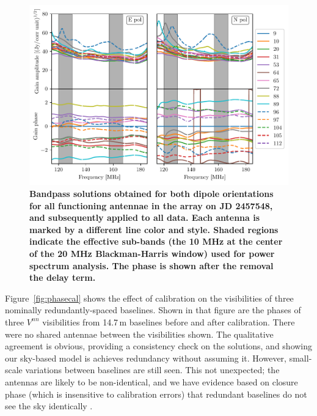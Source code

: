 \documentclass[twocolumn, trackchanges]{aastex61}
\newcommand{\edited}[1]{{\bf \color{red} #1}}
\begin{document}
{\begin{figure}
\centering
\includegraphics[scale=0.5]{gains.pdf}
\caption{\edited{Bandpass solutions obtained for both dipole orientations for all functioning antennae in the array on JD 2457548, and subsequently applied to all data.  Each antenna is marked by a different line color and style. Shaded regions indicate the effective sub-bands (the 10 MHz at the center of the 20 MHz Blackman-Harris window) used for power spectrum analysis.  The phase is shown after the removal the delay term.}}
\label{fig:bandpass}
\end{figure}


Figure~\ref{fig:phasecal} shows the effect of calibration on the visibilities of three nominally redundantly-spaced baselines.  Shown in that figure are the phases of three $V^{nn}$ visibilities from 14.7\,m baselines before and after calibration. There were no shared antennae between the visibilities shown. The qualitative agreement is obvious, providing a consistency check on the solutions, and showing our sky-based model is achieves redundancy without assuming it.  However, small-scale variations between baselines are still seen.  This not unexpected; the antennas are likely to be non-identical, and we have evidence based on closure phase (which is insensitive to calibration errors) that redundant baselines do not see the sky identically \citep{carilli18}.   

}
\end{document}

